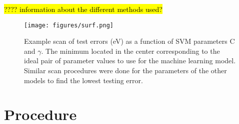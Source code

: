 \documentclass[10pt]{article}
\begin{document}
\hl{???? information about the different methods used?}



 \begin{figure}[H]
   \begin{center}
     \texttt{[image: figures/surf.png]}
   \end{center}
   \caption{Example scan of test errors (eV) as a function of SVM parameters C and $\gamma$. The minimum located in the center corresponding to the ideal pair of parameter values to use for the machine learning model. Similar scan procedures were done for the parameters of the other models to find the lowest testing error.}
   \label{fig:scan}
 \end{figure}

\section{Procedure}
\end{document}
